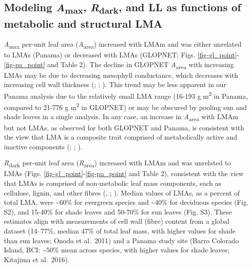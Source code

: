 \documentclass[
  12pt,
  letterpaper,
  DIV=11,
  numbers=noendperiod]{scrartcl}
\begin{document}
\subsection{\texorpdfstring{Modeling \emph{A}\textsubscript{max},
\emph{R}\textsubscript{dark}, and LL as functions of metabolic and
structural
LMA}{Modeling Amax, Rdark, and LL as functions of metabolic and structural LMA}}\label{modeling-amax-rdark-and-ll-as-functions-of-metabolic-and-structural-lma}

\emph{A}\textsubscript{max} per-unit leaf area
(\emph{A}\textsubscript{area}) increased with LMAm and was either
unrelated to LMAs (Panama) or decreased with LMAs (GLOPNET; Figs.
\ref{fig-gl_point}-\ref{fig-pa_point} and Table 2). The decline in
GLOPNET \emph{A}\textsubscript{area} with increasing LMAs may be due to
decreasing mesophyll conductance, which decreases with increasing cell
wall thickness (;
;
). This trend may be
less apparent in our Panama analysis due to the relatively small LMA
range (16-193 g m\textsuperscript{2} in Panama, compared to 21-776 g
m\textsuperscript{2} in GLOPNET) or may be obscured by pooling sun and
shade leaves in a single analysis. In any case, an increase in
\emph{A}\textsubscript{area} with LMAm but not LMAs, as observed for
both GLOPNET and Panama, is consistent with the view that LMA is a
composite trait comprised of metabolically active and inactive
components (;
;
).

\emph{R}\textsubscript{dark} per-unit leaf area
(\emph{R}\textsubscript{area}) increased with LMAm and was unrelated to
LMAs (Figs. \ref{fig-gl_point}-\ref{fig-pa_point} and Table 2),
consistent with the view that LMAs is comprised of non-metabolic leaf
mass components, such as cellulose, lignin, and other fibres
(,
; ). Median values of LMAs, as a percent of total LMA, were
\textasciitilde60\% for evergreen species and \textasciitilde40\% for
deciduous species (Fig. S2), and 15-40\% for shade leaves and 50-70\%
for sun leaves (Fig. S3). These estimates align with measurements of
cell wall (fibre) content from a global dataset (14--77\%, median 47\%
of total leaf mass, with higher values for shade than sun leaves; Onoda
et al.~2011) and a Panama study site (Barro Colorado Island, BCI:
\textasciitilde50\% mean across species, with higher values for shade
leaves; Kitajima et al.~2016).
\end{document}
